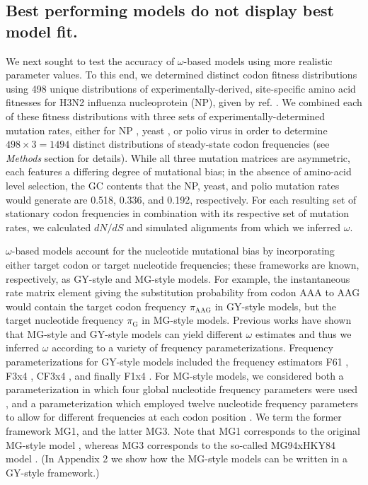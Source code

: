 \documentclass[11pt]{article}
\begin{document}
\subsection*{Best performing models do not display best model fit.}
We next sought to test the accuracy of $\omega$-based models using more realistic parameter values. To this end, we determined distinct codon fitness distributions using 498 unique distributions of experimentally-derived, site-specific amino acid fitnesses for H3N2 influenza nucleoprotein (NP), given by ref. \cite{Bloom2014a}. We combined each of these fitness distributions with three sets of experimentally-determined mutation rates, either for NP \cite{Bloom2014a}, yeast \cite{Zhu2014}, or polio virus \cite{Acevedo2014} in order to determine $498 \times 3 = 1494$ distinct distributions of steady-state codon frequencies (see \emph{Methods} section for details). While all three mutation matrices are asymmetric, each features a differing degree of mutational bias; in the absence of amino-acid level selection, the GC contents that the NP, yeast, and polio mutation rates would generate are 0.518, 0.336, and 0.192, respectively. For each resulting set of stationary codon frequencies in combination with its respective set of mutation rates, we calculated $dN/dS$ and simulated alignments from which we inferred $\omega$.

$\omega$-based models account for the nucleotide mutational bias by incorporating either target codon \cite{GoldmanYang1994} or target nucleotide \cite{MuseGaut1994} frequencies; these frameworks are known, respectively, as GY-style and MG-style models. For example, the instantaneous rate matrix element giving the substitution probability from codon AAA to AAG would contain the target codon frequency $\pi_\text{AAG}$ in GY-style models, but the target nucleotide frequency $\pi_\text{G}$ in MG-style models. Previous works have shown that MG-style and GY-style models can yield different $\omega$ estimates \cite{KosakovskyPondMuse2005,Yap2010} and thus we inferred $\omega$ according to a variety of frequency parameterizations. Frequency parameterizations for GY-style models included the frequency estimators F61 \cite{GoldmanYang1994}, F3x4 \cite{GoldmanYang1994}, CF3x4 \cite{KosakovskyPond2010}, and finally F1x4 \cite{MuseGaut1994}. For MG-style models, we considered both a parameterization in which four global nucleotide frequency parameters were used \cite{MuseGaut1994}, and a parameterization which employed twelve nucleotide frequency parameters to allow for different frequencies at each codon position \cite{KosakovskyPondMuse2005}. We term the former framework MG1, and the latter MG3. Note that MG1 corresponds to the original MG-style model \cite{MuseGaut1994}, whereas MG3 corresponds to the so-called MG94xHKY84 model \cite{KosakovskyPondMuse2005}. (In Appendix 2 we show how the MG-style models can be written in a GY-style framework.)
\end{document}
